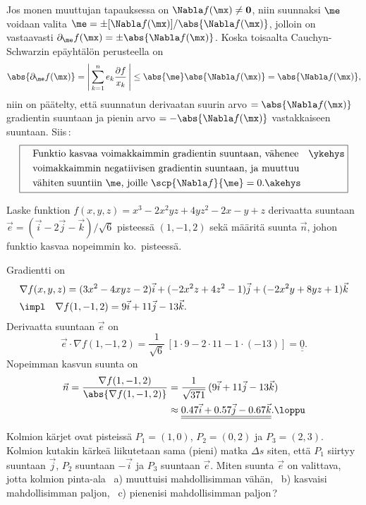 Jos monen muuttujan tapauksessa on $\Nabla f(\mx) \neq \boldsymbol{0}$, niin suunnaksi $\me$ 
voidaan valita $\me = \pm [\Nabla f(\mx)]/\abs{\Nabla f(\mx)}$, jolloin on vastaavasti 
$\partial_{\me}f(\mx) = \pm \abs{\Nabla f(\mx)}$. Koska toisaalta Cauchyn-Schwarzin epäyhtälön
perusteella on
\[ 
\abs{\partial_{\me}f(\mx)} =   \left|\,\sum_{k=1}^n e_k \frac{\partial f}{x_k}\,\right| 
                           \le \abs{\me}\abs{\Nabla f(\mx)} = \abs{\Nabla f(\mx)}, 
\]
niin on päätelty, että suunnatun derivaatan suurin arvo $=\abs{\Nabla f(\mx)}$ gradientin
suuntaan ja pienin arvo $=-\abs{\Nabla f(\mx)}$ vastakkaiseen suuntaan. Siis\,:
\[ \boxed{\begin{aligned}
\quad &\text{Funktio kasvaa voimakkaimmin gradientin suuntaan, vähenee}\quad\ykehys \\
      &\text{voimakkaimmin negatiivisen gradientin suuntaan, ja muuttuu} \\
      &\text{vähiten suuntiin $\me$, joille $\scp{\Nabla f}{\me}=0$}.\akehys
\end{aligned} } \] 
\begin{Exa} Laske funktion $f(x,y,z)=x^3-2x^2yz+4yz^2-2x-y+z$ derivaatta suuntaan 
$\vec e = (\vec i - 2\vec j - \vec k)/\sqrt{6}$ pisteessä $(1,-1,2)$ sekä määritä suunta
$\vec n$, johon funktio kasvaa nopeimmin ko.\ pisteessä.
\end{Exa}
\ratk Gradientti on
\begin{align*}
&\nabla f(x,y,z) = (3x^2-4xyz-2)\vec i + (-2x^2z+4z^2-1)\vec j + (-2x^2y+8yz+1)\vec k \\
&\impl\quad \nabla f(1,-1,2) = 9\vec i + 11\vec j - 13\vec k.
\end{align*}
Derivaatta suuntaan $\vec e$ on
\[ \vec e\cdot\nabla f(1,-1,2) = \frac{1}{\sqrt{6}}\,[1 \cdot 9 -2 \cdot 11 - 1 \cdot (-13)] 
                               = \underline{\underline{0}}. 
\]
Nopeimman kasvun suunta on
\begin{align*}
\vec n = \frac{\nabla f(1,-1,2)}{\abs{\nabla f(1,-1,2)}} 
      &= \frac{1}{\sqrt{371}}\,(9\vec i + 11\vec j -13\vec k) \\
      &\approx \underline{\underline{0.47\vec i + 0.57\vec j - 0.67\vec k}}. \loppu
\end{align*}
\begin{Exa} Kolmion kärjet ovat pisteissä $P_1=(1,0)$, $P_2=(0,2)$ ja $P_3=(2,3)$. Kolmion 
kutakin kärkeä liikutetaan sama (pieni) matka $\Delta s$ siten, että $P_1$ siirtyy suuntaan 
$\vec j$, $P_2$ suuntaan $-\vec i$ ja $P_3$ suuntaan $\vec e$. Miten suunta $\vec e$ on 
valittava, jotta kolmion pinta-ala \ a) muuttuisi mahdollisimman vähän, \ 
b) kasvaisi mahdollisimman paljon, \ c) pienenisi mahdollisimman paljon\,? 
\end{Exa}
